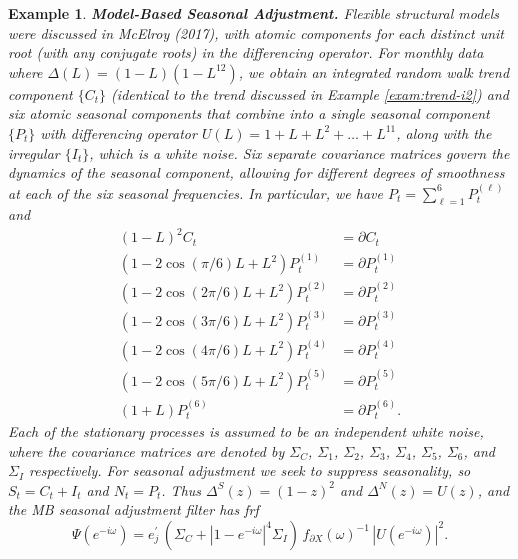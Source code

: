 \documentclass[a4paper]{book}
\newtheorem{Example}{Example}
\begin{document}
\begin{Example} {\bf Model-Based Seasonal Adjustment.} \rm
\label{exam:sa}
  Flexible structural models were discussed in McElroy (2017), 
  with atomic components for each distinct unit root
 (with any conjugate roots) in the differencing operator.  
 For monthly data  where $\Delta (L) = (1-L)(1-L^{12})$,
 we obtain an integrated random walk trend component $\{ C_t \}$ 
 (identical to the trend discussed in Example \ref{exam:trend-i2})
 and six atomic seasonal components that combine into a single 
 seasonal component $\{ P_t \}$ with differencing
 operator $U(L) = 1 + L + L^2 + \ldots + L^{11}$, along with the
 irregular $\{ I_t \}$, which is a white noise. 
  Six separate covariance matrices govern the dynamics of the seasonal
  component, allowing for different degrees of
 smoothness at each of the six seasonal frequencies. 
 In particular, we have $P_t = \sum_{\ell=1}^6 P^{(\ell)}_t$ and
\begin{align*}
  {(1-L)}^2 C_t & = \partial C_t \\
   (1 - 2 \cos (\pi/6) L + L^2) P^{(1)}_t & = \partial P^{(1)}_t \\
  (1 - 2 \cos (2\pi/6) L + L^2) P^{(2)}_t & = \partial P^{(2)}_t \\
  (1 - 2 \cos (3\pi/6) L + L^2) P^{(3)}_t & = \partial P^{(3)}_t \\
  (1 - 2 \cos (4\pi/6) L + L^2) P^{(4)}_t & = \partial P^{(4)}_t \\
  (1 - 2 \cos (5\pi/6) L + L^2) P^{(5)}_t & = \partial P^{(5)}_t \\
  (1 +L) P^{(6)}_t & = \partial P^{(6)}_t. 
 \end{align*}
 Each of the stationary processes is assumed to be an independent white noise,
 where the covariance matrices are denoted by $\Sigma_C$, $\Sigma_{1}$,
  $\Sigma_2$, $\Sigma_3$, $\Sigma_4$, $\Sigma_5$, $\Sigma_6$, and 
  $\Sigma_I$ respectively.   For seasonal adjustment we seek to suppress
  seasonality, so $S_t = C_t + I_t$ and $N_t = P_t$.  Thus $\Delta^S (z) = {(1-z)}^2$
  and $\Delta^N (z) = U(z)$, and the MB seasonal adjustment filter   has frf
\[
  \Psi (e^{-i \omega}) = e_j^{\prime} \, \left( \Sigma_{C} + {|1 - e^{-i \omega}|}^4
   \Sigma_I \right) \, 
    { f_{\partial X} (\omega) }^{-1} \, {| U (e^{-i \omega}) |}^2.
\]
\end{Example}
\end{document}

